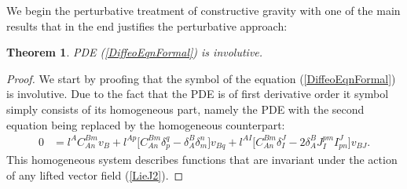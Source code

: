 \documentclass[a4paper,12pt, DIV=14, BCOR=5mm, twoside, headsepline]{scrbook}
\newtheorem{theorem}{Theorem}[section]
\begin{document}
We begin the perturbative treatment of constructive gravity with one of the main results that in the end justifies the perturbative approach:
\begin{theorem}
PDE (\ref{DiffeoEqnFormal}) is involutive.
\end{theorem}
\begin{proof}
We start by proofing that the symbol of the equation (\ref{DiffeoEqnFormal}) is involutive. Due to the fact that the PDE is of first derivative order it symbol simply consists of its homogeneous part, namely the PDE with the second equation being replaced by the homogeneous counterpart:
\begin{align}
    0 &= l^{A} C_{An}^{Bm} v_B + l^{Ap} \bigl[ C_{An}^{Bm} \delta_p^q - \delta_A^B \delta_m^n \bigr] v_{Bq} + l^{AI} \bigl[ C_{An}^{Bm} \delta_I^J - 2 \delta_A^B J_I^{pm} I^J_{pn}  \bigr] v_{BJ}.
\end{align}
This homogeneous system describes functions that are invariant under the action of any lifted vector field (\ref{LieJ2}). 


\end{proof}
\end{document}
